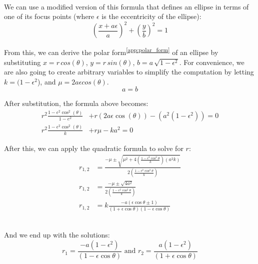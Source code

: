 \documentclass[12pt]{article}
\newcommand{\sref}[1]{\textsuperscript{\ref{#1}}}
\begin{document}
\begin{spacing}{1.25}
{    \hfill \\
    \noindent We can use a modified version of this formula that defines an ellipse in terms of one of its focus points (where \(\epsilon\) is the eccentricity of the ellipse):
    \begin{equation}
        \left( \frac{x + a\epsilon}{a} \right)^2 + \left( \frac{y}{b} \right)^2 = 1
    \end{equation}

    \noindent From this, we can derive the polar form\sref{app:polar_form} of an ellipse by substituting \(x = r \, cos(\theta) \), \(y = r \, sin(\theta)\), \(b = a \, \sqrt{1 - \epsilon^2}\). For convenience, we are also going to create arbitrary variables to simplify the computation by letting \(k = (1 - \epsilon^2\)), and \(\mu = 2a\epsilon cos(\theta)\).
    \begin{equation*}
        a=b
    \end{equation*}

    \noindent After substitution, the formula above becomes: 
    \begin{equation*}
        \begin{split}
            r^2 \frac{1 - \epsilon^2\cos^2(\theta)}{1-e^2} &+ r(2a\epsilon\cos(\theta)) - (a^2(1 - \epsilon^2)) = 0 \\
            r^2 \frac{1 - \epsilon^2\cos^2(\theta)}{k} &+ r\mu - ka^2 = 0
        \end{split}
    \end{equation*}
    
    \noindent After this, we can apply the quadratic formula to solve for \(r\):
    \begin{equation*}
        \begin{split}    
            r_{1, 2} &= \frac{
                -\mu \pm \sqrt{ \mu^2 + 4(\frac{1 - \epsilon^2\cos^2{\theta}}{k})(a^2k) }
            }{
                2( \frac{1 - \epsilon^2\cos^2{\theta}}{k} )
            } \\
            r_{1, 2} &= \frac{-\mu \pm \sqrt{4a^2}}
            {
                2( \frac{1 - \epsilon^2\cos^2{\theta}}{k} )
            } \\
            r_{1, 2} &= k \frac{-a(\epsilon\cos{\theta} \pm 1)}
            {
                (1 + \epsilon\cos{\theta})(1 - \epsilon\cos{\theta})
            }
        \end{split}
    \end{equation*}

    \hfill \\
    \noindent And we end up with the solutions:
    \begin{equation*}
        r_1 = \frac{-a(1 - \epsilon^2)}{(1 - \epsilon\cos{\theta})}
        \text{ and }
        r_2 = \frac{a(1 - \epsilon^2)}{(1 + \epsilon\cos{\theta})}
    \end{equation*}

}
\end{spacing}
\end{document}
